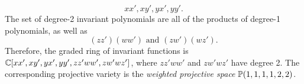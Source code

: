 	\begin{equation}
		xx', xy', yx', yy'.
	\end{equation} 
	The set of degree-2 invariant polynomials are all of the products of degree-1 polynomials, as well as 
	\begin{equation}
		(zz')(ww')\text{ and }(zw')(wz').
	\end{equation}
	Therefore, the graded ring of invariant functions is $\mathbb{C}[xx',xy',yx',yy',zz'ww',zw'wz']$, where $zz'ww'$ and $zw'wz'$ have degree 2. The corresponding projective variety is the \emph{weighted projective space} $\mathbb{P}(1,1,1,1,2,2)$.